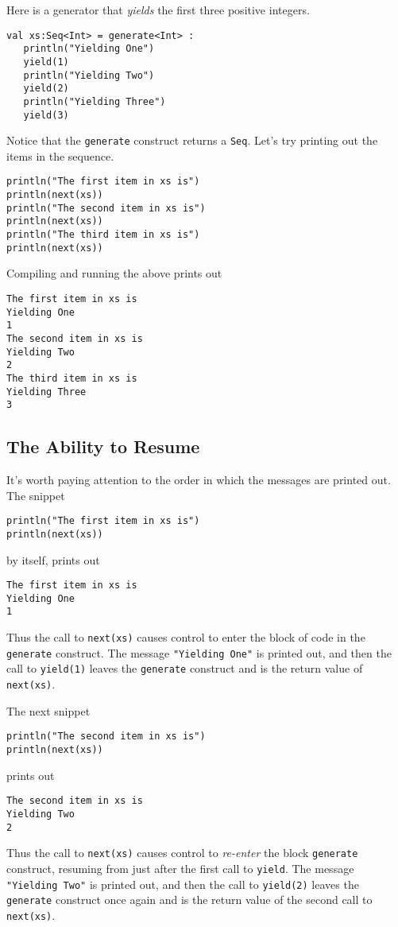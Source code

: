 \documentclass[10pt,oneside]{book}
\begin{document}
Here is a generator that {\em yields} the first three positive integers.
\begin{lstlisting}
val xs:Seq<Int> = generate<Int> :
   println("Yielding One")
   yield(1)
   println("Yielding Two")
   yield(2)
   println("Yielding Three")
   yield(3)
\end{lstlisting}
Notice that the \texttt{\frenchspacing generate} construct returns a \texttt{\frenchspacing Seq}. Let's try printing out the items in the sequence.
\begin{lstlisting}
println("The first item in xs is")
println(next(xs))
println("The second item in xs is")
println(next(xs))
println("The third item in xs is")
println(next(xs))
\end{lstlisting}
Compiling and running the above prints out
\begin{lstlisting}
The first item in xs is
Yielding One
1
The second item in xs is
Yielding Two
2
The third item in xs is
Yielding Three
3
\end{lstlisting}

\subsection*{The Ability to Resume}
It's worth paying attention to the order in which the messages are printed out. The snippet
\begin{lstlisting}
println("The first item in xs is")
println(next(xs))
\end{lstlisting}
by itself, prints out
\begin{lstlisting}
The first item in xs is
Yielding One
1
\end{lstlisting}
Thus the call to \texttt{\frenchspacing next(xs)} causes control to enter the block of code in the \texttt{\frenchspacing generate} construct. The message \texttt{\frenchspacing "Yielding One"} is printed out, and then the call to \texttt{\frenchspacing yield(1)} leaves the \texttt{\frenchspacing generate} construct and \texttt{} is the return value of \texttt{\frenchspacing next(xs)}.

The next snippet
\begin{lstlisting}
println("The second item in xs is")
println(next(xs))
\end{lstlisting}
prints out
\begin{lstlisting}
The second item in xs is
Yielding Two
2
\end{lstlisting}
Thus the call to \texttt{\frenchspacing next(xs)} causes control to {\em re-enter} the block \texttt{\frenchspacing generate} construct, resuming from just after the first call to \texttt{\frenchspacing yield}. The message \texttt{\frenchspacing "Yielding Two"} is printed out, and then the call to \texttt{\frenchspacing yield(2)} leaves the \texttt{\frenchspacing generate} construct once again and \texttt{} is the return value of the second call to \texttt{\frenchspacing next(xs)}.
\end{document}
